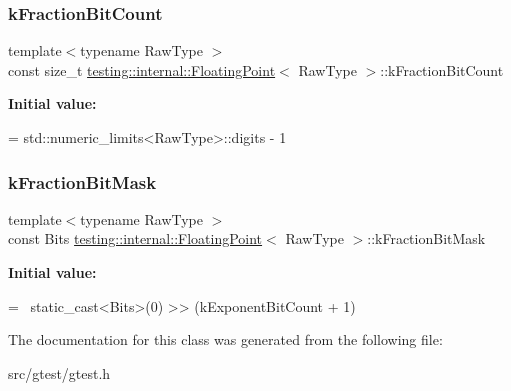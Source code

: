 \subsubsection{\texorpdfstring{k\+Fraction\+Bit\+Count}{kFractionBitCount}}
{\footnotesize\ttfamily template$<$typename Raw\+Type $>$ \\
const size\+\_\+t \mbox{\hyperlink{classtesting_1_1internal_1_1_floating_point}{testing\+::internal\+::\+Floating\+Point}}$<$ Raw\+Type $>$\+::k\+Fraction\+Bit\+Count\hspace{0.3cm}{\ttfamily [static]}}

{\bfseries Initial value\+:}
\begin{DoxyCode}
=
    std::numeric\_limits<RawType>::digits - 1
\end{DoxyCode}
\mbox{\label{classtesting_1_1internal_1_1_floating_point_a0ac75d4ffd24f14bca452abe8a718da1}} 
\subsubsection{\texorpdfstring{k\+Fraction\+Bit\+Mask}{kFractionBitMask}}
{\footnotesize\ttfamily template$<$typename Raw\+Type $>$ \\
const Bits \mbox{\hyperlink{classtesting_1_1internal_1_1_floating_point}{testing\+::internal\+::\+Floating\+Point}}$<$ Raw\+Type $>$\+::k\+Fraction\+Bit\+Mask\hspace{0.3cm}{\ttfamily [static]}}

{\bfseries Initial value\+:}
\begin{DoxyCode}
=
    ~static\_cast<Bits>(0) >> (kExponentBitCount + 1)
\end{DoxyCode}


The documentation for this class was generated from the following file\+:\begin{DoxyCompactItemize}
\item 
src/gtest/gtest.\+h\end{DoxyCompactItemize}
